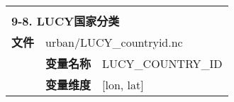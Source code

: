 \documentclass[a4paper,12pt,twoside]{article}
\begin{document}
\begin{longtable}{llp{}}
\midrule
\vspace{2\baselineskip}\\
\multicolumn{3}{l}{\textbf{9-8. LUCY国家分类}} \\
\cline{1-3}
\textbf{文件} & \multicolumn{2}{l}{urban/LUCY\_countryid.nc} \\
\cline{2-3}
& \textbf{变量名称} & LUCY\_COUNTRY\_ID \\
& \textbf{变量维度} & {[}lon, lat{]} \\

\end{longtable}




\end{document}
